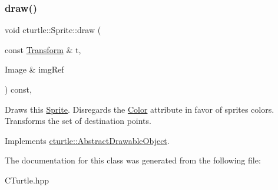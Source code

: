 \subsubsection{\texorpdfstring{draw()}{draw()}}
{\footnotesize\ttfamily void cturtle\+::\+Sprite\+::draw (\begin{DoxyParamCaption}\item[{const \hyperlink{classcturtle_1_1Transform}{Transform} \&}]{t,  }\item[{Image \&}]{img\+Ref }\end{DoxyParamCaption}) const\hspace{0.3cm}{\ttfamily [inline]}, {\ttfamily [virtual]}}

Draws this \hyperlink{classcturtle_1_1Sprite}{Sprite}. Disregards the \hyperlink{classcturtle_1_1Color}{Color} attribute in favor of sprites colors. Transforms the set of destination points. 

Implements \hyperlink{classcturtle_1_1AbstractDrawableObject_a7b1ad1e9743d343e0fe577de3978bdad}{cturtle\+::\+Abstract\+Drawable\+Object}.



The documentation for this class was generated from the following file\+:\begin{DoxyCompactItemize}
\item 
C\+Turtle.\+hpp\end{DoxyCompactItemize}
